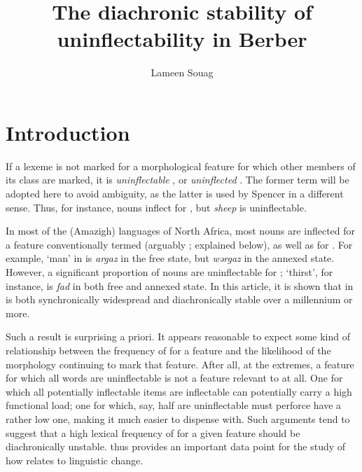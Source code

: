 \documentclass[output=paper,colorlinks,citecolor=brown]{langscibook}
\author{Lameen Souag\orcid{}\affiliation{LACITO (CNRS - Sorbonne Nouvelle - INALCO)}}
\title{The diachronic stability of uninflectability in Berber}
\begin{document}
\maketitle

\section{Introduction} \label{13sec1}

If a lexeme is not marked for a morphological feature for which other members of its class are marked, it is \emph{uninflectable} \citep{spencer2020}, or \emph{uninflected} \citep[30]{baermanbrowncorbett2005}. The former term will be adopted here to avoid ambiguity, as the latter is used by Spencer in a different sense. Thus, for instance,  nouns inflect for , but \emph{sheep} is uninflectable.

In most of the  (Amazigh) languages of North Africa, most nouns are inflected for a feature conventionally termed \textit{} (arguably ; explained below), as well as for . For example, `man' in  is \emph{argaz} in the free state, but \emph{wərgaz} in the annexed state. However, a significant proportion of nouns are uninflectable for ;  `thirst', for instance, is \emph{fad} in both free and annexed state. In this article, it is shown that  in  is both synchronically widespread and diachronically stable over a millennium or more.

Such a result is surprising a priori. It appears reasonable to expect some kind of relationship between the frequency of  for a feature and the likelihood of the morphology continuing to mark that feature. After all, at the extremes, a feature for which all words are uninflectable is not a feature relevant to  at all. One for which all potentially inflectable items are inflectable can potentially carry a high functional load; one for which, say, half are uninflectable must perforce have a rather low one, making it much easier to dispense with. Such arguments tend to suggest that a high lexical frequency of  for a given feature should be diachronically unstable.  thus provides an important data point for the study of how  relates to linguistic change.
\end{document}
